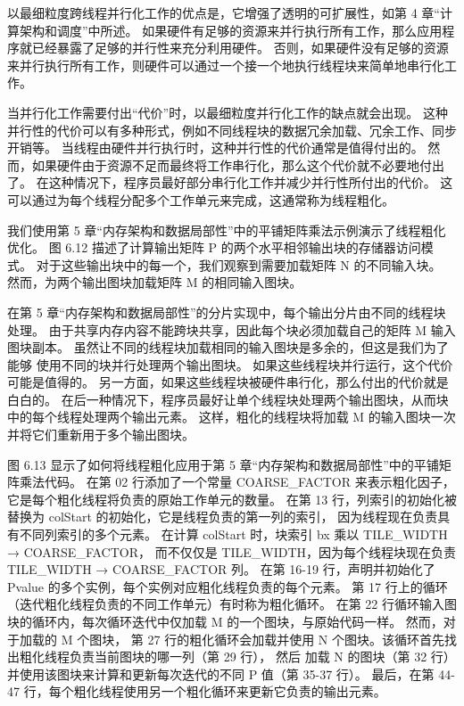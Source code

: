 以最细粒度跨线程并行化工作的优点是，它增强了透明的可扩展性，如第 4 章“计算架构和调度”中所述。 
如果硬件有足够的资源来并行执行所有工作，那么应用程序就已经暴露了足够的并行性来充分利用硬件。 
否则，如果硬件没有足够的资源来并行执行所有工作，则硬件可以通过一个接一个地执行线程块来简单地串行化工作。

当并行化工作需要付出“代价”时，以最细粒度并行化工作的缺点就会出现。 
这种并行性的代价可以有多种形式，例如不同线程块的数据冗余加载、冗余工作、同步开销等。 
当线程由硬件并行执行时，这种并行性的代价通常是值得付出的。 
然而，如果硬件由于资源不足而最终将工作串行化，那么这个代价就不必要地付出了。 
在这种情况下，程序员最好部分串行化工作并减少并行性所付出的代价。 
这可以通过为每个线程分配多个工作单元来完成，这通常称为线程粗化。

我们使用第 5 章“内存架构和数据局部性”中的平铺矩阵乘法示例演示了线程粗化优化。 
图 6.12 描述了计算输出矩阵 P 的两个水平相邻输出块的存储器访问模式。
对于这些输出块中的每一个，我们观察到需要加载矩阵 N 的不同输入块。 然而，为两个输出图块加载矩阵 M 的相同输入图块。

在第 5 章“内存架构和数据局部性”的分片实现中，每个输出分片由不同的线程块处理。 
由于共享内存内容不能跨块共享，因此每个块必须加载自己的矩阵 M 输入图块副本。
虽然让不同的线程块加载相同的输入图块是多余的，但这是我们为了能够 使用不同的块并行处理两个输出图块。 
如果这些线程块并行运行，这个代价可能是值得的。 另一方面，如果这些线程块被硬件串行化，那么付出的代价就是白白的。 
在后一种情况下，程序员最好让单个线程块处理两个输出图块，从而块中的每个线程处理两个输出元素。 
这样，粗化的线程块将加载 M 的输入图块一次并将它们重新用于多个输出图块。

图 6.13 显示了如何将线程粗化应用于第 5 章“内存架构和数据局部性”中的平铺矩阵乘法代码。 
在第 02 行添加了一个常量 COARSE\_FACTOR 来表示粗化因子，它是每个粗化线程将负责的原始工作单元的数量。 
在第 13 行，列索引的初始化被替换为 colStart 的初始化，它是线程负责的第一列的索引，
因为线程现在负责具有不同列索引的多个元素。 在计算 colStart 时，块索引 bx 乘以 TILE\_WIDTH → COARSE\_FACTOR，
而不仅仅是 TILE\_WIDTH，因为每个线程块现在负责 TILE\_WIDTH → COARSE\_FACTOR 列。 
在第 16-19 行，声明并初始化了 Pvalue 的多个实例，每个实例对应粗化线程负责的每个元素。 
第 17 行上的循环（迭代粗化线程负责的不同工作单元）有时称为粗化循环。 
在第 22 行循环输入图块的循环内，每次循环迭代中仅加载 M 的一个图块，与原始代码一样。 然而，对于加载的 M 个图块，
第 27 行的粗化循环会加载并使用 N 个图块。该循环首先找出粗化线程负责当前图块的哪一列（第 29 行），
然后 加载 N 的图块（第 32 行）并使用该图块来计算和更新每次迭代的不同 P 值（第 35-37 行）。 
最后，在第 44-47 行，每个粗化线程使用另一个粗化循环来更新它负责的输出元素。


